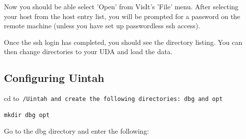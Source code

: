\documentclass[12pt]{article}
\begin{document}
Now you should be able select 'Open' from VisIt's 'File' menu. After selecting your host from the host entry list, you will be prompted for a password on the remote machine (unless you have set up passwordless ssh access). 

Once the ssh login has completed, you should see the directory listing. You can then change directories to your UDA and load the data. 















\subsection{Configuring Uintah}

cd to\tt ~/Uintah \normalfont and create the following directories:
dbg and opt

\begin{verbatim}
mkdir dbg opt
\end{verbatim}

Go to the dbg directory and enter the following:
\end{document}
